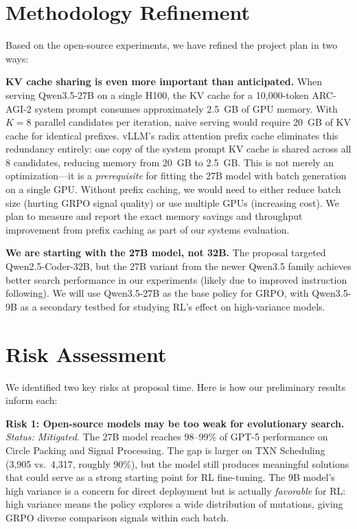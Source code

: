 \documentclass{article}
\begin{document}
\section*{Methodology Refinement}

Based on the open-source experiments, we have refined the project plan in two ways:

\textbf{KV cache sharing is even more important than anticipated.} When serving Qwen3.5-27B on a single H100, the KV cache for a 10,000-token ARC-AGI-2 system prompt consumes approximately 2.5~GB of GPU memory. With $K=8$ parallel candidates per iteration, naive serving would require 20~GB of KV cache for identical prefixes. vLLM's radix attention prefix cache eliminates this redundancy entirely: one copy of the system prompt KV cache is shared across all 8 candidates, reducing memory from 20~GB to 2.5~GB. This is not merely an optimization---it is a \emph{prerequisite} for fitting the 27B model with batch generation on a single GPU. Without prefix caching, we would need to either reduce batch size (hurting GRPO signal quality) or use multiple GPUs (increasing cost). We plan to measure and report the exact memory savings and throughput improvement from prefix caching as part of our systems evaluation.

\textbf{We are starting with the 27B model, not 32B.} The proposal targeted Qwen2.5-Coder-32B, but the 27B variant from the newer Qwen3.5 family achieves better search performance in our experiments (likely due to improved instruction following). We will use Qwen3.5-27B as the base policy for GRPO, with Qwen3.5-9B as a secondary testbed for studying RL's effect on high-variance models.

\section*{Risk Assessment}

We identified two key risks at proposal time. Here is how our preliminary results inform each:

\textbf{Risk 1: Open-source models may be too weak for evolutionary search.} \emph{Status: Mitigated.} The 27B model reaches 98--99\% of GPT-5 performance on Circle Packing and Signal Processing. The gap is larger on TXN Scheduling (3,905 vs.\ 4,317, roughly 90\%), but the model still produces meaningful solutions that could serve as a strong starting point for RL fine-tuning. The 9B model's high variance is a concern for direct deployment but is actually \emph{favorable} for RL: high variance means the policy explores a wide distribution of mutations, giving GRPO diverse comparison signals within each batch.
\end{document}
